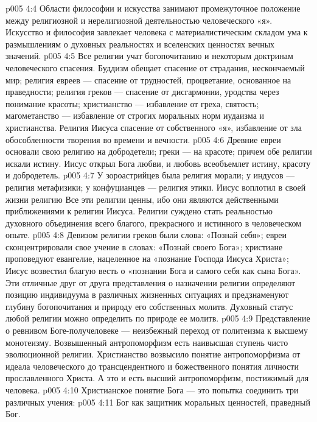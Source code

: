 \vs p005 4:4 \pc Области философии и искусства занимают промежуточное положение между религиозной и нерелигиозной деятельностью человеческого «я». Искусство и философия завлекает человека с материалистическим складом ума к размышлениям о духовных реальностях и вселенских ценностях вечных значений.
\vs p005 4:5 \pc Все религии учат богопочитанию и некоторым доктринам человеческого спасения. Буддизм обещает спасение от страдания, нескончаемый мир; религия евреев --- спасение от трудностей, процветание, основанное на праведности; религия греков --- спасение от дисгармонии, уродства через понимание красоты; христианство --- избавление от греха, святость; магометанство --- избавление от строгих моральных норм иудаизма и христианства. Религия Иисуса  спасение от собственного «я», избавление от зла обособленности творения во времени и вечности.
\vs p005 4:6 Древние евреи основали свою религию на добродетели; греки --- на красоте; причем обе религии искали истину. Иисус открыл Бога любви, и любовь всеобъемлет истину, красоту и добродетель.
\vs p005 4:7 У зороастрийцев была религия морали; у индусов --- религия метафизики; у конфуцианцев --- религия этики. Иисус воплотил в своей жизни религию  Все эти религии ценны, ибо они являются действенными приближениями к религии Иисуса. Религии суждено стать реальностью духовного объединения всего благого, прекрасного и истинного в человеческом опыте.
\vs p005 4:8 Девизом религии греков были слова: «Познай себя»; евреи сконцентрировали свое учение в словах: «Познай своего Бога»; христиане проповедуют евангелие, нацеленное на «познание Господа Иисуса Христа»; Иисус возвестил благую весть о «познании Бога и самого себя как сына Бога». Эти отличные друг от друга представления о назначении религии определяют позицию индивидуума в различных жизненных ситуациях и предзнаменуют глубину богопочитания и природу его собственных молитв. Духовный статус любой религии можно определить по природе ее молитв.
\vs p005 4:9 \pc Представление о ревнивом Боге\hyp{}получеловеке --- неизбежный переход от политеизма к высшему монотеизму. Возвышенный антропоморфизм есть наивысшая ступень чисто эволюционной религии. Христианство возвысило понятие антропоморфизма от идеала человеческого до трансцендентного и божественного понятия личности прославленного Христа. А это и есть высший антропоморфизм, постижимый для человека.
\vs p005 4:10 \pc Христианское понятие Бога --- это попытка соединить три различных учения:
\vs p005 4:11 \bibnobreakspace {} Бог как защитник моральных ценностей, праведный Бог.
